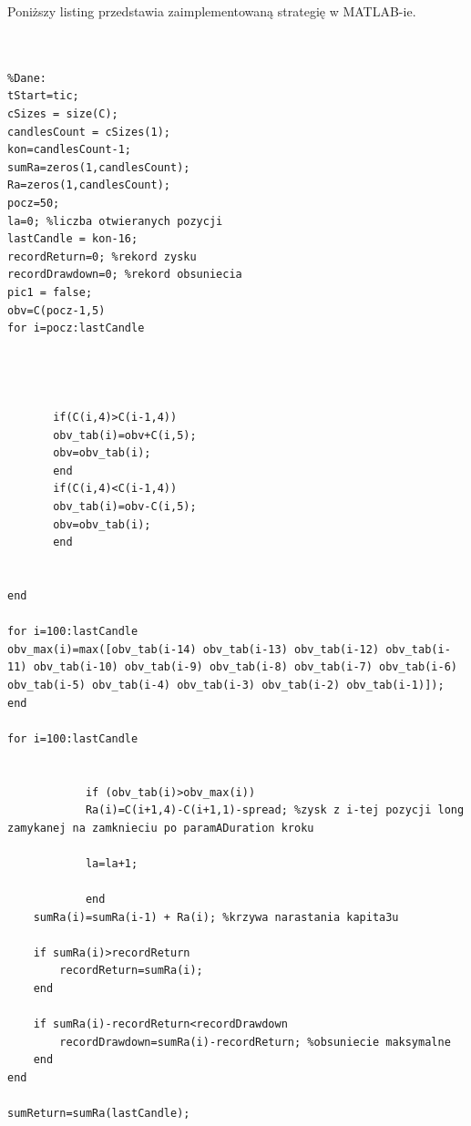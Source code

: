\noindent Poniższy listing przedstawia zaimplementowaną strategię w MATLAB-ie.
\begin{scriptsize}
\begin{lstlisting}


%Dane:
tStart=tic;
cSizes = size(C);
candlesCount = cSizes(1);
kon=candlesCount-1;
sumRa=zeros(1,candlesCount);
Ra=zeros(1,candlesCount);
pocz=50;
la=0; %liczba otwieranych pozycji
lastCandle = kon-16;
recordReturn=0; %rekord zysku
recordDrawdown=0; %rekord obsuniecia
pic1 = false;
obv=C(pocz-1,5)
for i=pocz:lastCandle
 
   
    
    
       if(C(i,4)>C(i-1,4))
       obv_tab(i)=obv+C(i,5);
       obv=obv_tab(i);
       end
       if(C(i,4)<C(i-1,4))
       obv_tab(i)=obv-C(i,5);
       obv=obv_tab(i);
       end
       
        
end

for i=100:lastCandle
obv_max(i)=max([obv_tab(i-14) obv_tab(i-13) obv_tab(i-12) obv_tab(i-11) obv_tab(i-10) obv_tab(i-9) obv_tab(i-8) obv_tab(i-7) obv_tab(i-6) obv_tab(i-5) obv_tab(i-4) obv_tab(i-3) obv_tab(i-2) obv_tab(i-1)]);
end

for i=100:lastCandle
    
    
            if (obv_tab(i)>obv_max(i))
            Ra(i)=C(i+1,4)-C(i+1,1)-spread; %zysk z i-tej pozycji long zamykanej na zamknieciu po paramADuration kroku
            
            la=la+1;
      
            end
    sumRa(i)=sumRa(i-1) + Ra(i); %krzywa narastania kapita3u
    
    if sumRa(i)>recordReturn
        recordReturn=sumRa(i);
    end
    
    if sumRa(i)-recordReturn<recordDrawdown
        recordDrawdown=sumRa(i)-recordReturn; %obsuniecie maksymalne
    end
end

sumReturn=sumRa(lastCandle);




\end{lstlisting}
\end{scriptsize}



